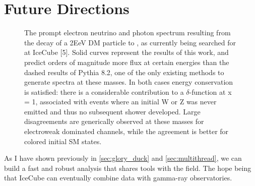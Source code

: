 \section{Future Directions \label{sec:future}}

\begin{figure}[h]
    \caption{The prompt electron neutrino and photon spectrum resulting from the decay of a 2EeV DM particle to , as currently being searched for at IceCube [5]. Solid curves represent the results of this work, and predict orders of magnitude more flux at certain energies than the dashed results of Pythia 8.2, one of the only existing methods to generate spectra at these masses. In both cases energy conservation is satisfied: there is a considerable contribution to a $\delta$-function at x = 1, associated with events where an initial W or Z was never emitted and thus no subsequent shower developed. Large disagreements are generically observed at these masses for electroweak dominated channels, while the agreement is better for colored initial SM states.}
    \label{fig:nu_and_gam}
\end{figure}

As I have shown previously in \cref{sec:glory_duck} and \cref{sec:multithread}, we can build a fast and robust analysis that shares tools with the field.
The hope being that IceCube can eventually combine data with gamma-ray observatories.
